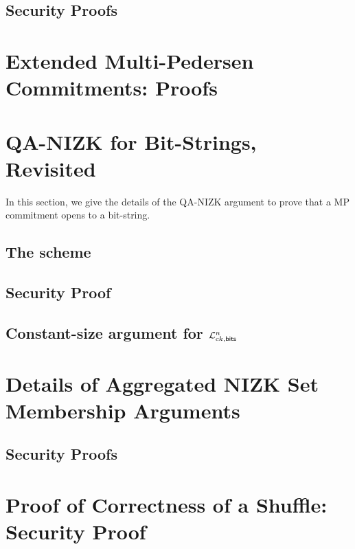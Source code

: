 \documentclass[11pt]{llncs}
\begin{document}
    \subsection{Security Proofs}
        



\appendix

\section{Extended Multi-Pedersen Commitments: Proofs} \label{app:mp}
    
\section{QA-NIZK for Bit-Strings, Revisited} \label{app:bits}
In this section, we give the details of the QA-NIZK argument to prove that a MP commitment opens to a bit-string.
    \subsection{The scheme} \label{sec:bits-scheme} 
        
    \subsection{Security Proof} \label{app:proofbits}
        
    \subsection{Constant-size argument for $\mathcal{L}_{ck,\mathsf{bits}}^n$} \label{app:bits-n}
        
        
\section{Details of Aggregated NIZK Set Membership Arguments} \label{app:bin-lang}
    
    \subsection{Security Proofs}
        
\section{Proof of Correctness of a Shuffle: Security Proof} \label{app:shuffle}
    
\end{document}
